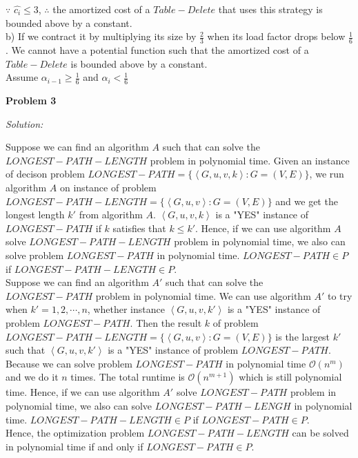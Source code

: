 \documentclass[12pt,letterpaper]{article}
\def\pp{\par\noindent}
\newcommand{\problem}[1]{ \bigskip \pp \textbf{Problem #1}\par}
\newcommand{\solution}{\textit{Solution:}\par}
\begin{document}
$\because$ $\widehat{c_i} \le 3$, $\therefore$ the amortized cost of a $Table-Delete$ that uses this strategy is bounded above by a constant. \\
b) If we contract it by multiplying its size by $\frac{2}{3}$ when its load factor drops below $\frac{1}{6}$. We cannot have a potential function such that the amortized cost of a $Table−Delete$ is bounded above by a constant. \\
Assume $\alpha_{i-1} \ge \frac{1}{6}$ and $\alpha_{i} < \frac{1}{6}$

\problem{3}
\solution
Suppose we can find an algorithm $A$ such that can solve the $LONGEST-PATH-LENGTH$ problem in polynomial time.
Given an instance of decison problem $LONGEST-PATH = \{ \left \langle G,u,v,k \right \rangle : G = (V,E) \}$,
we run algorithm $A$ on instance of problem $LONGEST-PATH-LENGTH = \{ \left \langle G,u,v \right \rangle : G = (V,E) \} $
and we get the longest length $k'$ from algorithm $A$. $ \left \langle G,u,v,k \right \rangle $ is a "YES" instance of $LONGEST-PATH$
if $k$ satisfies that $k \le k'$. Hence, if we can use algorithm $A$ solve $LONGEST-PATH-LENGTH$ problem in polynomial time, we also can
solve problem $LONGEST-PATH$ in polynomial time. $LONGEST-PATH \in P$ if $LONGEST-PATH-LENGTH \in P$. \\
Suppose we can find an algorithm $A'$ such that can solve the $LONGEST-PATH$ problem in polynomial time.
We can use algorithm $A'$ to try when $k' = 1,2,\cdots,n$, whether instance $ \left \langle G,u,v,k' \right \rangle $ is a "YES" instance of problem
$LONGEST-PATH$. Then the result $k$ of problem $LONGEST-PATH-LENGTH = \{ \left \langle G,u,v \right \rangle : G = (V,E) \} $ is
the largest $k'$ such that $ \left \langle G,u,v,k' \right \rangle $ is a "YES" instance of problem $LONGEST-PATH$. Because we can
solve problem $LONGEST-PATH$ in polynomial time $\mathcal{O}(n^m)$ and we do it $n$ times. The total runtime is $\mathcal{O}(n^{m+1})$ which is still
polynomial time. Hence, if we can use algorithm $A'$ solve $LONGEST-PATH$ problem in polynomial time, we also can solve $LONGEST-PATH-LENGH$ in polynomial time.
$LONGEST-PATH-LENGTH \in P$ if $LONGEST-PATH \in P$. \\
Hence, the optimization problem $LONGEST-PATH-LENGTH$ can be solved in polynomial time if and only if $LONGEST-PATH \in P$.
\end{document}
